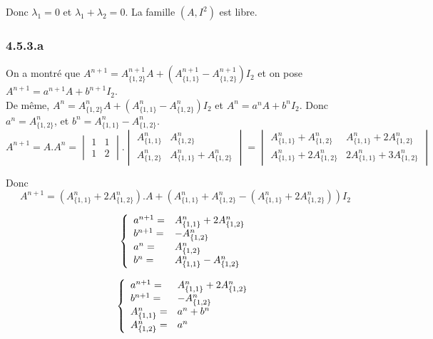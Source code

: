 \documentclass[]{book}
\theoremstyle{definition}
\begin{document}
Donc $\lambda_1 = 0$ et $\lambda_1 + \lambda_2 = 0$. La famille $(A,I^2)$ est libre.\\

\subsubsection*{4.5.3.a}
On a montr\'e que $A^{n+1} = A^{n+1}_{\{1,2\}}A + (A^{n+1}_{\{1,1\}} - A^{n+1}_{\{1,2\}})I_2$ et on pose $A^{n+1} = a^{n+1}A + b^{n+1}I_2$.\\
De m\^eme, $A^{n} = A^{n}_{\{1,2\}}A + (A^{n}_{\{1,1\}} - A^{n}_{\{1,2\}})I_2$ et $A^{n} = a^{n}A + b^{n}I_2$. Donc $a^{n} = A^{n}_{\{1,2\}}$, et $b^n = A^{n}_{\{1,1\}} - A^{n}_{\{1,2\}}$. \\


$$
A^{n+1} = A.A^n = 
\begin{vmatrix} 1 & 1 \\ 1 & 2 \end{vmatrix} . 
\begin{vmatrix} A^n_{\{1,1\}} & A^n_{\{1,2\}} \\ A^n_{\{1,2\}} & A^n_{\{1,1\}} + A^n_{\{1,2\}} \end{vmatrix} = 
\begin{vmatrix} A^n_{\{1,1\}} + A^n_{\{1,2\}} & A^n_{\{1,1\}}+2A^n_{\{1,2\}} \\ A^n_{\{1,1\}} + 2A^n_{\{1,2\}} & 2A^n_{\{1,1\}} + 3A^n_{\{1,2\}} \end{vmatrix}
$$

Donc
$$A^{n+1} = (A^n_{\{1,1\}}+2A^n_{\{1,2\}}).A +  (A^n_{\{1,1\}} + A^n_{\{1,2\}} - (A^n_{\{1,1\}}+2A^n_{\{1,2\}}))I_2$$

$$
\left\{ 
\begin{array}{l l}
a^{n+1} = & A^n_{\{1,1\}}+2A^n_{\{1,2\}} \\
b^{n+1} = & -A^n_{\{1,2\}} \\
a^{n} = & A^{n}_{\{1,2\}} \\
b^{n} = & A^{n}_{\{1,1\}} - A^{n}_{\{1,2\}} \\
\end{array}
\right. 
$$

$$
\left\{ 
\begin{array}{l l}
a^{n+1} = & A^n_{\{1,1\}}+2A^n_{\{1,2\}} \\
b^{n+1} = & -A^n_{\{1,2\}} \\
A^{n}_{\{1,1\}} = & a^{n} + b^{n} \\
A^{n}_{\{1,2\}} = & a^{n} \\
\end{array}
\right. 
$$
\end{document}
